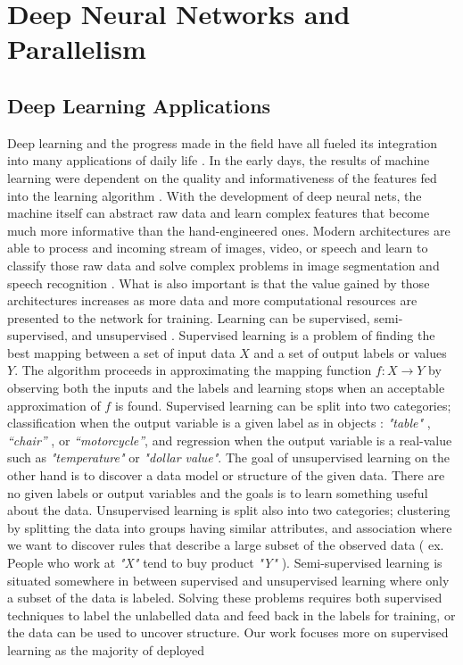 
\chapter{Deep Neural Networks and Parallelism} %

\label{Chapter2} %

\section{Deep Learning Applications}

Deep learning and the progress made in the field have all fueled its integration into many applications of daily life \cite{ddl}. In the early days, the results of machine learning were dependent on the quality and informativeness of the features fed into the learning algorithm \cite{csaji2001approximation}. With the development of deep neural nets, the machine itself can abstract raw data and learn complex features that become much more informative than the hand-engineered ones. Modern architectures are able to process and incoming stream of images, video, or speech and learn to classify those raw data and solve complex problems in image segmentation and speech recognition \cite{lecun2015deep, resnet, densenet}. What is also important is that the value gained by those architectures increases as more data and more computational resources are presented to the network for training. Learning can be supervised, semi-supervised, and unsupervised \cite{lecun2015deep}. Supervised learning is a problem of finding the best mapping between a set of input data $\mathit{X}$ and a set of output labels or values $\mathit{Y}$. The algorithm proceeds in approximating the mapping function $\mathit{ f : X \rightarrow Y}$ by observing both the inputs and the labels and learning stops when an acceptable approximation of $\mathit{f}$ is found. Supervised learning can be split into two categories; classification when the output variable is a given label as in objects : \emph{"table"} , \emph{“chair”} , or \emph{“motorcycle”}, and regression when the output variable is a real-value such as \emph{"temperature"} or \emph{"dollar value"}. The goal of unsupervised learning on the other hand is to discover a data model or structure of the given data. There are no given labels or output variables and the goals is to learn something useful about the data. Unsupervised learning is split also into two categories; clustering by splitting the data into groups having similar attributes, and association where we want to discover rules that describe a large subset of the observed data ( ex. People who work at \emph{"X"} tend to buy product \emph{"Y"} ). Semi-supervised learning is situated somewhere in between supervised and unsupervised learning where only a subset of the data is labeled. Solving these problems requires both supervised techniques to label the unlabelled data and feed back in the labels for training, or the data can be used to uncover structure. Our work focuses more on supervised learning as the majority of deployed 